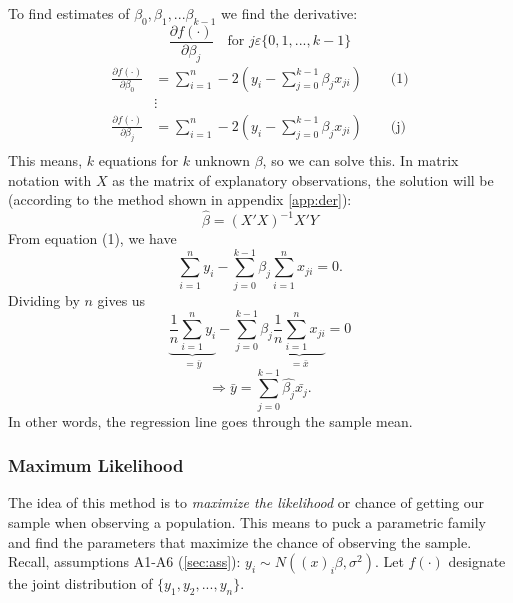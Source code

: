 		To find estimates of  $\beta_0,\beta_1,...\beta_{k-1}$ we find the derivative:
		\begin{equation*}
			\frac{\partial f(\cdot)}{\partial \beta_j}\quad\text{for }j\varepsilon\{0,1,...,k-1\}
		\end{equation*}
		\begin{align*}
				\frac{\partial f(\cdot)}{\partial \beta_0}&=\sum\limits_{i=1}^n -2\left(y_i-\sum\limits_{j=0}^{k-1}\beta_j x_{ji}\right)\qquad\text{(1)}\\
				&\vdots\\
				\frac{\partial f(\cdot)}{\partial \beta_j}&=\sum\limits_{i=1}^n -2\left(y_i-\sum\limits_{j=0}^{k-1}\beta_j x_{ji}\right)\qquad\text{(j)}\\				
		\end{align*}
		This means, $k$ equations for $k$ unknown $\beta$, so we can solve this. In matrix notation with $X$ as the matrix of explanatory observations, the solution will be (according to the method shown in appendix \ref{app:der}):
		\begin{equation*}
			\hat{\beta}=(X'X)^{-1}X'Y
		\end{equation*}
		From equation (1), we have
		\begin{equation*}
			 \sum\limits_{i=1}^n y_i-\sum\limits_{j=0}^{k-1}\beta_j   \sum\limits_{i=1}^n x_{ji}=0.
		\end{equation*}
		Dividing by $n$ gives us
		\begin{equation*}
			\underbrace{\frac{1}{n}\sum\limits_{i=1}^n y_{i}}_{=\bar{y}}-\sum\limits_{j=0}^{k-1}\beta_j \underbrace{\frac{1}{n}\sum\limits_{i=1}^n x_{ji}}_{=\bar{x}}=0
		\end{equation*}	
		\begin{equation*}
			\Longrightarrow \bar{y}=\sum\limits_{j=0}^{k-1}\hat{\beta_j}\bar{x_j}.
		\end{equation*}
		In other words, the regression line goes through the sample mean.
\subsubsection{Maximum Likelihood}
	The idea of this method is to \emph{maximize the likelihood} or chance of getting our sample when observing a population. This means to puck a parametric family and find the parameters that maximize the chance of observing the sample. Recall, assumptions A1-A6 (\ref{sec:ass}): $y_i\sim N\left((x)_i\beta,\sigma^2\right)$. Let $f(\cdot)$ designate the joint distribution of $\{y_1,y_2,...,y_n\}$.
	
